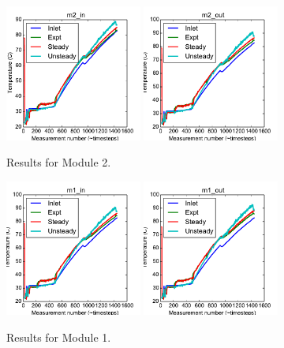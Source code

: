 \documentclass{article}
\begin{document}
\clearpage
\begin{figure}[!ht]
\centering
\includegraphics[width=0.4\textwidth]{../../data/ICSolar/images/Feb28_m2_in_compare.pdf}\hspace{0.05\textwidth}
\includegraphics[width=0.4\textwidth]{../../data/ICSolar/images/Feb28_m2_out_compare.pdf}\hspace{0.05\textwidth}\\
\caption{Results for Module 2.}\end{figure}
\begin{figure}[!ht]
\centering
\includegraphics[width=0.4\textwidth]{../../data/ICSolar/images/Feb28_m1_in_compare.pdf}\hspace{0.05\textwidth}
\includegraphics[width=0.4\textwidth]{../../data/ICSolar/images/Feb28_m1_out_compare.pdf}\hspace{0.05\textwidth}\\
\caption{Results for Module 1.}\end{figure}
\end{document}
